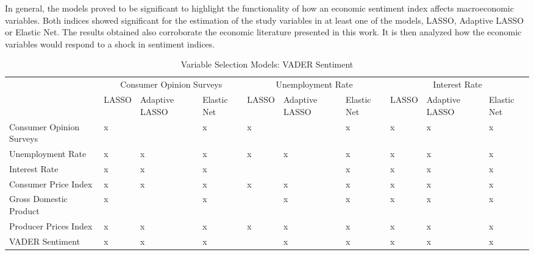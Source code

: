 In general, the models proved to be significant to highlight the functionality of how an economic sentiment index affects macroeconomic variables. Both indices showed significant for the estimation of the study variables in at least one of the models, LASSO, Adaptive LASSO or Elastic Net. The results obtained also corroborate the economic literature presented in this work. It is then analyzed how the economic variables would respond to a shock in sentiment indices.

\begin{landscape}
\begin{table}[]
\caption{Variable Selection Models: VADER Sentiment}
\label{tab:selectionvader}
\begin{adjustbox}{max width=\linewidth}
\begin{tabular}{llllllllll}
\hline
                         & \multicolumn{3}{c}{Consumer Opinion   Surveys} & \multicolumn{3}{c}{Unemployment Rate}      & \multicolumn{3}{c}{Interest Rate}         \\
                         & LASSO     & Adaptive LASSO    & Elastic Net    & LASSO    & Adaptive LASSO   & Elastic Net  & LASSO   & Adaptive LASSO   & Elastic Net  \\
Consumer Opinion Surveys & x         &                   & x              & x        &                  & x            & x       & x                & x            \\
Unemployment Rate        & x         & x                 & x              & x        & x                & x            & x       & x                & x            \\
Interest Rate            & x         & x                 & x              &          &                  & x            & x       & x                & x            \\
Consumer Price Index     & x         & x                 & x              & x        & x                & x            & x       & x                & x            \\
Gross Domestic Product   & x         &                   & x              &          & x                & x            & x       & x                & x            \\
Producer Prices Index    & x         & x                 & x              & x        & x                & x            & x       & x                & x            \\ \hline
VADER Sentiment          & x         & x                 & x              &          & x                & x            & x       & x                & x            \\ \hline

\end{tabular}
\end{adjustbox}
\end{table}
\end{landscape}
